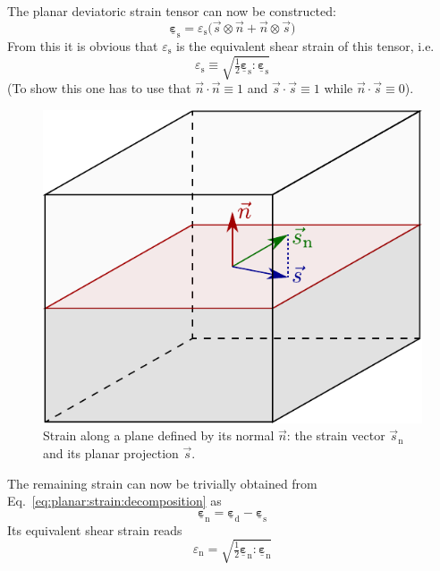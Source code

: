 \documentclass[times,namecite]{goose-article}
\newcommand\T[1]{\underline{\bm{{#1}}}}
\begin{document}
The planar deviatoric strain tensor can now be constructed:
\begin{equation}
  \T{\varepsilon}_\mathrm{s} = \varepsilon_\mathrm{s}
  \big(
    \vec{s} \otimes \vec{n} + \vec{n} \otimes \vec{s}
  \big)
\end{equation}
From this it is obvious that $\varepsilon_\mathrm{s}$ is the equivalent shear strain of this tensor, i.e.
\begin{equation}
  \varepsilon_\mathrm{s}
  \equiv
  \sqrt{ \tfrac{1}{2} \T{\varepsilon}_\mathrm{s} : \T{\varepsilon}_\mathrm{s} }
\end{equation}
(To show this one has to use that $\vec{n} \cdot \vec{n} \equiv 1$ and $\vec{s} \cdot \vec{s} \equiv 1$ while $\vec{n} \cdot \vec{s} \equiv 0$).

\begin{figure}[htp]
  \centering
  \includegraphics[width=.35\textwidth]{figures/strain-vector-planar}
  \caption{Strain along a plane defined by its normal $\vec{n}$: the strain vector $\vec{s}_\mathrm{n}$ and its planar projection $\vec{s}$.}
  \label{fig:strain-vector-planar}
\end{figure}

The remaining strain can now be trivially obtained from Eq.~\eqref{eq:planar:strain:decomposition} as
\begin{equation}
  \T{\varepsilon}_\mathrm{n} = \T{\varepsilon}_\mathrm{d} - \T{\varepsilon}_\mathrm{s}
\end{equation}
Its equivalent shear strain reads
\begin{equation}
  \varepsilon_\mathrm{n} = \sqrt{ \tfrac{1}{2} \T{\varepsilon}_\mathrm{n} : \T{\varepsilon}_\mathrm{n} }
\end{equation}
\end{document}
